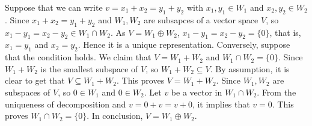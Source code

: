 \begin{solution}
			Suppose that we can write $v = x_1 + x_2 = y_1 + y_2$ with $x_1,y_1 \in W_1$ and $x_2,y_2 \in W_2$. Since $x_1 + x_2 = y_1 + y_2$ and $W_1,W_2$ are subsapces of a vector space $V$, so $x_1 - y_1 = x_2 - y_2 \in W_1 \cap W_2$. As $V =  W_1 \oplus W_2$, $x_1 - y_1 = x_2 - y_2 = \{0\}$, that is, $x_1 = y_1$ and $x_2 = y_2$. Hence it is a unique representation. Conversely, suppose that the condition holds. We claim that $V = W_1 + W_2$ and $W_1 \cap W_2 = \{0\}$. Since $W_1 + W_2$ is the smallest subspace of $V$, so $W_1 + W_2 \subseteq V$. By assumption, it is clear to get that $V \subseteq W_1 + W_2$. This proves $V = W_1 + W_2$. Since $W_1,W_2$ are subspaces of $V$, so $0 \in W_1$ and $0 \in W_2$. Let $v$ be a vector in $W_1 \cap W_2$. From the uniqueness of decomposition and $v = 0 + v = v + 0$, it implies that $v = 0$. This proves $W_1 \cap W_2 = \{0\}$. In conclusion, $V = W_1 \oplus W_2$.
		\end{solution}